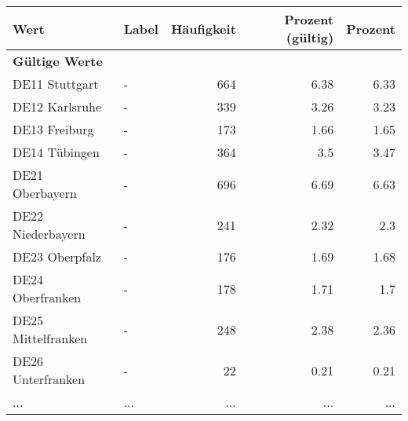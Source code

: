      \begin{longtable}{Xlrrr}
     \toprule
     \textbf{Wert} & \textbf{Label} & \textbf{Häufigkeit} & \textbf{Prozent (gültig)} & \textbf{Prozent} \\
     \endhead
     \midrule
     \multicolumn{5}{l}{\textbf{Gültige Werte}}\\
        \multicolumn{1}{X}{DE11 Stuttgart} & - & \num{664} & \num[round-mode=places,round-precision=2]{6.38} & \num[round-mode=places,round-precision=2]{6.33} \\
        \multicolumn{1}{X}{DE12 Karlsruhe} & - & \num{339} & \num[round-mode=places,round-precision=2]{3.26} & \num[round-mode=places,round-precision=2]{3.23} \\
        \multicolumn{1}{X}{DE13 Freiburg} & - & \num{173} & \num[round-mode=places,round-precision=2]{1.66} & \num[round-mode=places,round-precision=2]{1.65} \\
        \multicolumn{1}{X}{DE14 Tübingen} & - & \num{364} & \num[round-mode=places,round-precision=2]{3.5} & \num[round-mode=places,round-precision=2]{3.47} \\
        \multicolumn{1}{X}{DE21 Oberbayern} & - & \num{696} & \num[round-mode=places,round-precision=2]{6.69} & \num[round-mode=places,round-precision=2]{6.63} \\
        \multicolumn{1}{X}{DE22 Niederbayern} & - & \num{241} & \num[round-mode=places,round-precision=2]{2.32} & \num[round-mode=places,round-precision=2]{2.3} \\
        \multicolumn{1}{X}{DE23 Oberpfalz} & - & \num{176} & \num[round-mode=places,round-precision=2]{1.69} & \num[round-mode=places,round-precision=2]{1.68} \\
        \multicolumn{1}{X}{DE24 Oberfranken} & - & \num{178} & \num[round-mode=places,round-precision=2]{1.71} & \num[round-mode=places,round-precision=2]{1.7} \\
        \multicolumn{1}{X}{DE25 Mittelfranken} & - & \num{248} & \num[round-mode=places,round-precision=2]{2.38} & \num[round-mode=places,round-precision=2]{2.36} \\
        \multicolumn{1}{X}{DE26 Unterfranken} & - & \num{22} & \num[round-mode=places,round-precision=2]{0.21} & \num[round-mode=places,round-precision=2]{0.21} \\
       ... & ... & ... & ... & ... \\

\end{longtable}
